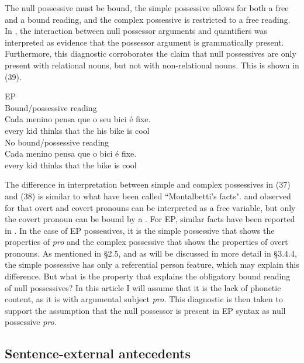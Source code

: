 \documentclass[output=paper]{langsci/langscibook}
\begin{document}
The null possessive must be bound, the simple possessive allows for both a free and a bound reading, and the complex possessive is restricted to a free reading. In \citet[1112]{Barker2011}, the interaction between null possessor arguments and quantifiers was interpreted as evidence that the possessor argument is grammatically present. Furthermore, this diagnostic corroborates the claim that null possessives are only present with relational nouns, but not with non-relational nouns. This is shown in (39).

\ea%
    EP\label{ex:wein:39}\\
    \ea  Bound\slash possessive reading\\
    \gll Cada menino pensa que o seu bici é fixe.\\
     every kid thinks that the his bike is cool\\
    \ex  No bound\slash possessive reading\\
    \gll Cada menino pensa que o bici é fixe.\\
     every kid thinks that the bike is cool\\
    \z
\z

The difference in interpretation between simple and complex possessives in (37) and (38) is similar to what have been called “Montalbetti’s facts". \citet{Montalbetti1984} and \citet{Alonso-Ovalle2001} observed for  that overt and covert pronouns can be interpreted as a free variable, but only the covert pronoun can be bound by a . For EP, similar facts have been reported in \citet{Lobo2013}. In the case of EP possessives, it is the simple possessive that shows the properties of \textit{pro} and the complex possessive that shows the properties of overt pronouns. As mentioned in §2.5, and as will be discussed in more detail in §3.4.4, the simple possessive has only a referential person feature, which may explain this difference. But what is the property that explains the obligatory bound reading of null possessives? In this article I will assume that it is the lack of phonetic content, as it is with argumental subject \textit{pro.} This diagnostic is then taken to support the assumption that the null possessor is present in EP syntax as null possessive \textit{pro.}

\subsection{Sentence-external antecedents}%
\end{document}
